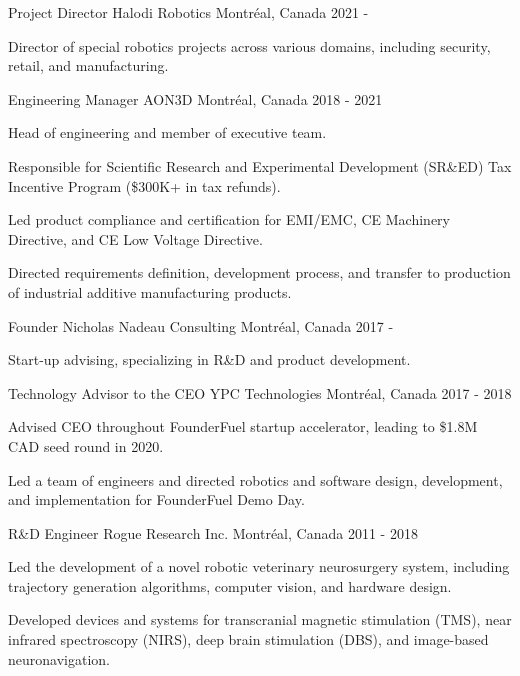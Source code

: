\begin{cventries}

\cventry
{Project Director}
{Halodi Robotics}
{Montréal, Canada}
{2021 - }
{
\begin{cvitems}
\item{Director of special robotics projects across various domains, including security, retail, and manufacturing.}
\end{cvitems}
}

\cventry
{Engineering Manager}
{AON3D}
{Montréal, Canada}
{2018 - 2021}
{
\begin{cvitems}
\item{Head of engineering and member of executive team.}
\item{Responsible for Scientific Research and Experimental Development (SR\&ED) Tax Incentive Program (\$300K+ in tax refunds).}
\item{Led product compliance and certification for EMI/EMC, CE Machinery Directive, and CE Low Voltage Directive.}
\item{Directed requirements definition, development process, and transfer to production of industrial additive manufacturing products.}
\end{cvitems}
}

\cventry
{Founder}
{Nicholas Nadeau Consulting}
{Montréal, Canada}
{2017 - }
{
\begin{cvitems}
\item{Start-up advising, specializing in R\&D and product development.}
\end{cvitems}
}

\cventry
{Technology Advisor to the CEO}
{YPC Technologies}
{Montréal, Canada}
{2017 - 2018}
{
\begin{cvitems}
\item{Advised CEO throughout FounderFuel startup accelerator, leading to \$1.8M CAD seed round in 2020.}
\item{Led a team of engineers and directed robotics and software design, development, and implementation for FounderFuel Demo Day.}
\end{cvitems}
}

\cventry
{R\&D Engineer}
{Rogue Research Inc.}
{Montréal, Canada}
{2011 - 2018}
{
\begin{cvitems}
\item{Led the development of a novel robotic veterinary neurosurgery system, including trajectory generation algorithms, computer vision, and hardware design.}
\item{Developed devices and systems for transcranial magnetic stimulation (TMS), near infrared spectroscopy (NIRS), deep brain stimulation (DBS), and image-based neuronavigation.}
\end{cvitems}
}

\end{cventries}
